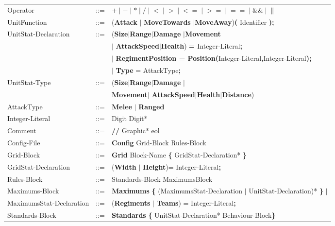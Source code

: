\begin{center}
\begin{longtable}{ l l l }
				Operator			&	::=	&$\boldsymbol {+} \mid \boldsymbol {-} \mid  \boldsymbol {*}\mid 
												\boldsymbol {/} \mid \boldsymbol {<} \mid  \boldsymbol {>} \mid
												\boldsymbol {<=} \mid  \boldsymbol {>=} \mid \boldsymbol {==} 
												\mid \boldsymbol {\&\&} \mid \boldsymbol {\|}$\\
				UnitFunction		&	::=	&({\bf Attack} $\mid$ {\bf MoveTowards} $\mid${\bf MoveAway}){\bf (} Identifier {\bf );}\\
				UnitStat-Declaration&	::=	&({\bf Size}$\mid${\bf Range}$\mid${\bf Damage} $\mid${\bf Movement}\\ 
									&		&$\mid$ {\bf AttackSpeed}$\mid${\bf Health}) ${\bf = }$ Integer-Literal{\bf ;} \\
									&		&$\mid$ {\bf RegimentPosition = Position(}Integer-Literal{\bf ,}Integer-Literal{\bf );}\\
									&		&$\mid$ {\bf Type} = AttackType{\bf ;}\\
				UnitStat-Type		&	::=	&({\bf Size}$\mid${\bf Range}$\mid${\bf Damage} $\mid$\\
									&		&{\bf Movement}$\mid$ {\bf AttackSpeed}$\mid${\bf Health}$\mid${\bf Distance})\\ 
				AttackType			&	::=	&{\bf Melee} $\mid$ {\bf Ranged} \\
				Integer-Literal		&	::=	&Digit Digit*\\
				Comment				&	::=	&{\bf //} Graphic* eol\\
				Config-File			&	::=	&{\bf Config} Grid-Block Rules-Block  		\\
				Grid-Block			&	::=	&{\bf Grid} Block-Name	 {\bf \{} GridStat-Declaration* \bf{\}} \\
				GridStat-Declaration&	::=	&({\bf Width} $\mid$ {\bf Height})=  Integer-Literal{\bf ;} \\	
				Rules-Block			&	::=	&Standards-Block MaximumsBlock 				\\
				Maximums-Block		&	::=	&{\bf Maximums} {\bf \{} (MaximumsStat-Declaration $\mid$ UnitStat-Declaration)* {\bf \}} $\mid$ \\
				MaximumsStat-Declaration&	::=	&({\bf Regiments }$\mid$ {\bf Teams}) =  Integer-Literal{\bf ;}\\		 
				Standards-Block		&	::=	&{\bf Standards} {\bf \{ } UnitStat-Declaration* Behaviour-Block\bf{\} }		\\
			\end{longtable}
		\end{center}					     